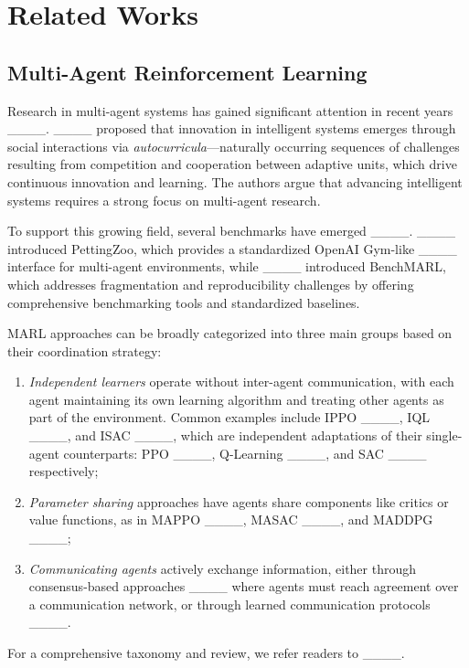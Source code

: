 \section{Related Works}
\vspace{0.1in}
\subsection{Multi-Agent Reinforcement Learning} 
\vspace{0.1in}
\label{sec:marl}

Research in multi-agent systems has gained significant attention in recent years ____. ____ proposed that innovation in intelligent systems emerges through social interactions via \emph{autocurricula}—naturally occurring sequences of challenges resulting from competition and cooperation between adaptive units, which drive continuous innovation and learning. The authors argue that advancing intelligent systems requires a strong focus on multi-agent research.

To support this growing field, several benchmarks have emerged ____. ____ introduced PettingZoo, which provides a standardized OpenAI Gym-like ____ interface for multi-agent environments, while ____ introduced BenchMARL, which addresses fragmentation and reproducibility challenges by offering comprehensive benchmarking tools and standardized baselines.

MARL approaches can be broadly categorized into three main groups based on their coordination strategy:

\begin{enumerate}
\item \emph{Independent learners} operate without inter-agent communication, with each agent maintaining its own learning algorithm and treating other agents as part of the environment. Common examples include IPPO ____, IQL ____, and ISAC ____, which are independent adaptations of their single-agent counterparts: PPO ____, Q-Learning ____, and SAC ____ respectively;
\item \emph{Parameter sharing} approaches have agents share components like critics or value functions, as in MAPPO ____, MASAC ____, and MADDPG ____;
\item \emph{Communicating agents} actively exchange information, either through consensus-based approaches ____ where agents must reach agreement over a communication network, or through learned communication protocols ____.
\end{enumerate}
For a comprehensive taxonomy and review, we refer readers to ____.

